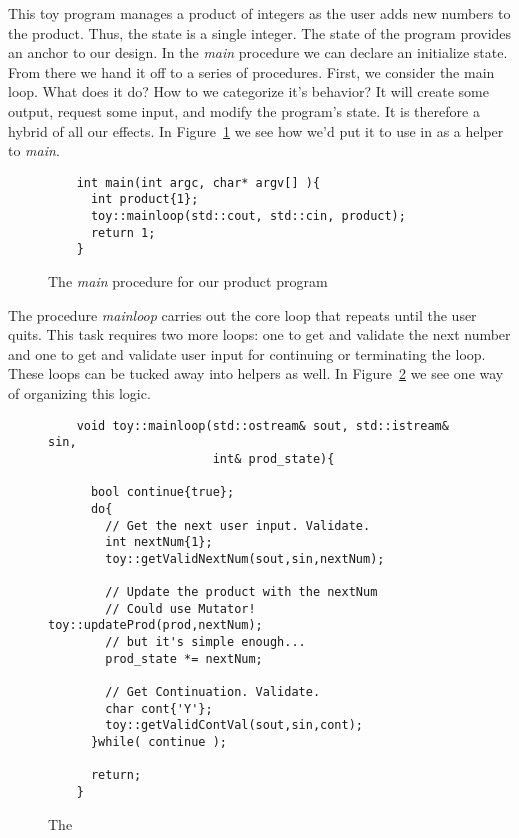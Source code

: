 \documentclass[]{tufte-handout}
\begin{document}
This toy program manages a product of integers as the user adds new numbers to the product. Thus, the state is a single integer. The state of the program provides an anchor to our design.  In the \textit{main} procedure we can declare an initialize state. From there we hand it off to a series of procedures. First, we consider the main loop. What does it do? How to we categorize it's behavior? It will create some output, request some input, and modify the program's state. It is therefore a hybrid of all our effects. In Figure~\ref{ex:main} we see how we'd put it to use in as a helper to \textit{main}.

\begin{figure}
  \begin{lstlisting}
    int main(int argc, char* argv[] ){
      int product{1};
      toy::mainloop(std::cout, std::cin, product);
      return 1;
    }
  \end{lstlisting}
\caption{The \textit{main} procedure for our product program}
\label{ex:main}
\end{figure}

The procedure \textit{mainloop} carries out the core loop that repeats until the user quits. This task requires two more loops: one to get and validate the next number and one to get and validate user input for continuing or terminating the loop. These loops can be tucked away into helpers as well. In Figure~\ref{ex:mainloop} we see one way of organizing this logic.

\begin{figure}
  \begin{lstlisting}
    void toy::mainloop(std::ostream& sout, std::istream& sin,
                       int& prod_state){

      bool continue{true};
      do{
        // Get the next user input. Validate.
        int nextNum{1};
        toy::getValidNextNum(sout,sin,nextNum);

        // Update the product with the nextNum
        // Could use Mutator! toy::updateProd(prod,nextNum);
        // but it's simple enough...
        prod_state *= nextNum;

        // Get Continuation. Validate.
        char cont{'Y'};
        toy::getValidContVal(sout,sin,cont);
      }while( continue );

      return;
    }
  \end{lstlisting}
\caption{The }
\label{ex:mainloop}
\end{figure}
\end{document}
